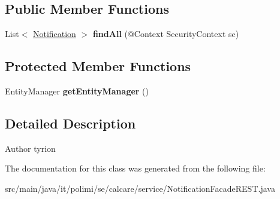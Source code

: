 \subsection*{Public Member Functions}
\begin{DoxyCompactItemize}
\item 
\hypertarget{classit_1_1polimi_1_1se_1_1calcare_1_1service_1_1NotificationFacadeREST_afc9a695d34cfc09011a34893409cf355}{}List$<$ \hyperlink{classit_1_1polimi_1_1se_1_1calcare_1_1entities_1_1Notification}{Notification} $>$ {\bfseries find\+All} (@Context Security\+Context sc)\label{classit_1_1polimi_1_1se_1_1calcare_1_1service_1_1NotificationFacadeREST_afc9a695d34cfc09011a34893409cf355}

\end{DoxyCompactItemize}
\subsection*{Protected Member Functions}
\begin{DoxyCompactItemize}
\item 
\hypertarget{classit_1_1polimi_1_1se_1_1calcare_1_1service_1_1NotificationFacadeREST_a57a4f68684a2d4df6d212e4bc95e2060}{}Entity\+Manager {\bfseries get\+Entity\+Manager} ()\label{classit_1_1polimi_1_1se_1_1calcare_1_1service_1_1NotificationFacadeREST_a57a4f68684a2d4df6d212e4bc95e2060}

\end{DoxyCompactItemize}


\subsection{Detailed Description}
\begin{DoxyAuthor}{Author}
tyrion 
\end{DoxyAuthor}


The documentation for this class was generated from the following file\+:\begin{DoxyCompactItemize}
\item 
src/main/java/it/polimi/se/calcare/service/Notification\+Facade\+R\+E\+S\+T.\+java\end{DoxyCompactItemize}
